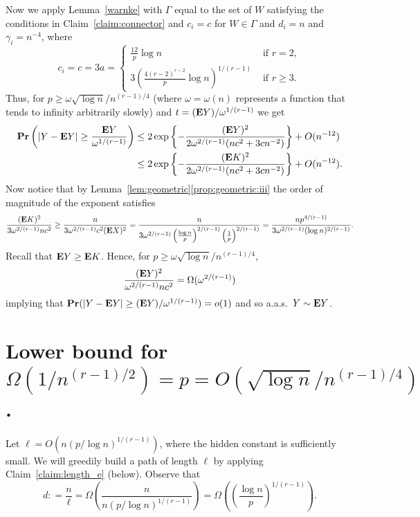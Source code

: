 \documentclass[12pt,reqno]{amsart}
\theoremstyle{remark}
\newcommand{\brac}[1]{\left(#1\right)}
\def\E{\mbox{{\bf E}}}
\def\Pr{\mbox{{\bf Pr}}}
\def\E{\mbox{{\bf E}}}
\def\Pr{\mbox{{\bf Pr}}}
\begin{document}
Now we apply Lemma~\ref{warnke} with $\Gamma$ equal to the set of $W$ satisfying the conditions in Claim~\ref{claim:connector} and $c_i=c$ for $W\in\Gamma$ and $d_i=n$ and $\gamma_i=n^{-4}$, where  
\[
c_i=c=3a=
\begin{cases}
\frac{12}{p} \log n & \text{ if } r=2,\\
3\left(\frac{4(r-2)^{r-2}}{p} \log n \right)^{1/(r-1)} & \text{ if } r\ge3. 
\end{cases}
\]
Thus, for $p\ge\omega\sqrt{\log n}/n^{(r-1)/4}$ (where $\omega=\omega(n)$ represents a function that tends to infinity arbitrarily
slowly) and $t=(\E Y)/\omega^{1/(r-1)}$ we get
\begin{align*}
\Pr\brac{|Y -\E Y| \ge \frac{\E Y}{\omega^{1/(r-1)}}} &\le 2 \exp\left\{-\frac{(\E Y)^2}{2\omega^{2/(r-1)} (n c^2+3cn^{-2})}\right\}+O(n^{-12})\\
&\le 2 \exp\left\{-\frac{(\E K)^2}{2\omega^{2/(r-1)} (n c^2+3cn^{-2})}\right\}+O(n^{-12}).
\end{align*}
Now notice that by Lemma~\ref{lem:geometric}\eqref{prop:geometric:iii} the order of magnitude of the exponent satisfies
\[
\frac{(\E K)^2}{3\omega^{2/(r-1)} n c^2}
\ge \frac{n}{3\omega^{2/(r-1)} c^2 (\E X)^2}
= \frac{n}{3\omega^{2/(r-1)} \left(\frac{\log n}{p}\right)^{2/(r-1)} \left(\frac{1}{p}\right)^{2/(r-1)}}
= \frac{np^{4/(r-1)}}{3\omega^{2/(r-1)} (\log n)^{2/(r-1)}}.
\]
Recall that $\E Y \ge \E K$.
Hence, for $p\ge\omega\sqrt{\log n}/n^{(r-1)/4}$, 
\[
\frac{(\E Y)^2}{\omega^{2/(r-1)} n c^2} = \Omega(\omega^{2/(r-1)})
\]
implying that $\Pr(|Y -\E Y| \ge (\E Y)/\omega^{1/(r-1)})=o(1)$  and so a.a.s.\ $Y\sim \E Y$.


\section{Lower bound for $\Omega(1/n^{(r-1)/2}) = p = O(\sqrt{\log n}/n^{(r-1)/4})$.}\label{sec:4}

Let $\ell=O(n(p/\log n)^{1/(r-1)})$, where the hidden constant is sufficiently small. We will greedily build a path of length $\ell$ by applying Claim~\ref{claim:length_e} (below). Observe that 
\[
d: = \frac{n}{\ell} = \Omega\left( \frac{n}{n(p/\log n)^{1/(r-1)}} \right) =\Omega\left(\left(\frac{\log n}{p} \right)^{1/(r-1)}\right).
\]
 
\end{document}
